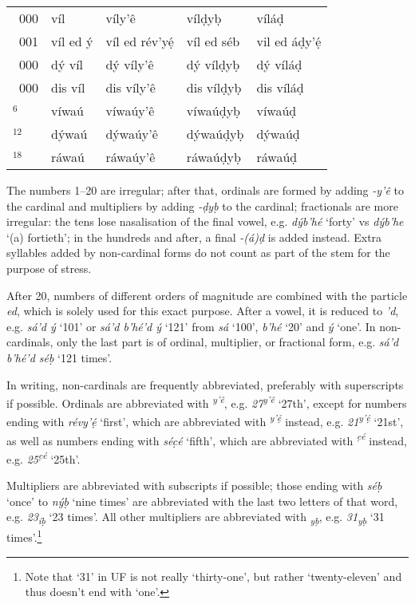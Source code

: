 \documentclass[a4paper, 12pt, twoside, final]{article}
\let \nf \normalfont
\let \w \textit
\let \Sub \textsubscript
\let \Sup \textsuperscript
\begin{document}
{\begin{longtable}{>{\nf}l|l|l|l|l}
    1~000  & víl             & víly’ê             & vílḍyḅ            & víláḍ           \\
    1~001  & víl ed ý        & víl ed rév’yẹ́      & víl ed séb        & vil ed áḍy’ẹ́    \\
    2~000  & dý víl          & dý víly’ê          & dý vílḍyḅ         & dý víláḍ        \\
    10~000 & dis víl         & dis víly’ê         & dis vílḍyḅ        & dis víláḍ       \\
    10$^6$ & víwaú           & víwaúy’ê           & víwaúḍyḅ          & víwaúḍ          \\
    10$^{12}$& dýwaú         & dýwaúy’ê           & dýwaúḍyḅ          & dýwaúḍ          \\
    10$^{18}$& ráwaú         & ráwaúy’ê           & ráwaúḍyḅ          & ráwaúḍ          \\
\end{longtable}
}

\noindent
The numbers 1–20 are irregular;
after that, ordinals are formed by adding \w{-y’ê} to the cardinal and multipliers by adding \w{-ḍyḅ} to the cardinal;
fractionals are more irregular: the tens lose nasalisation of the final vowel, e.g. \w{dýb’hé} ‘forty’ vs \w{dýb’he}
‘(a) fortieth’; in the hundreds and after, a final \w{-(á)ḍ} is added instead. Extra syllables added by non-cardinal
forms do not count as part of the stem for the purpose of stress.

After 20, numbers of different orders of magnitude are combined with the particle \w{ed}, which is solely used for this
exact purpose. After a vowel, it is reduced to \w{’d}, e.g. \w{sá’d ý} ‘101’ or \w{sá’d b’hé’d ý} ‘121’ from \w{sá} ‘100’,
\w{b’hé} ‘20’ and \w{ý} ‘one’. In non-cardinals, only the last part is of ordinal, multiplier,
or fractional form, e.g. \w{sá’d b’hé’d séḅ} ‘121 times’.

In writing, non-cardinals are frequently abbreviated, preferably with superscripts if possible. Ordinals are abbreviated
with \w{\Sup{y’ê}}, e.g. \w{27\Sup{y’ê}} ‘27th’, except for numbers ending
with \w{révy’ẹ́} ‘first’, which are abbreviated with \w{\Sup{y’ẹ́}} instead, e.g. \w{21\Sup{y’ẹ́}} ‘21st’, as
well as numbers ending with \w{séc̣é} ‘fifth’, which are abbreviated with \w{\Sup{c̣é}} instead, e.g. \w{25\Sup{c̣é}}
‘25th’.

Multipliers are abbreviated with subscripts if possible; those ending with \w{séḅ} ‘once’ to \w{nýḅ} ‘nine times’ are
abbreviated with the last two letters of that
word, e.g. \w{23\Sub{íḅ}} ‘23 times’. All other multipliers are abbreviated with \w{\Sub{yḅ}}, e.g. \w{31\Sub{yḅ}}
‘31 times’.\footnote{Note that ‘31’ in UF is not really ‘thirty-one’, but rather ‘twenty-eleven’ and thus doesn’t
end with ‘one’.}
\end{document}
